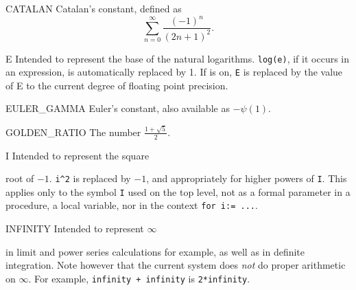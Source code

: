\begin{list}{}{\renewcommand{\makelabel}[1]{\texttt{#1}\hspace{\fill}}%
               \setlength{\labelsep}{1em}%
               }

\item[CATALAN] Catalan's constant, defined as
  \begin{displaymath}
    \sum_{n=0}^{\infty} \frac{(-1)^{n}}{(2n+1)^{2}} .
  \end{displaymath}

\item[E] Intended to represent the base of
the natural logarithms.  \texttt{log(e)}, if it occurs in an expression, is
automatically replaced by 1.  If  is
on, \texttt{E} is replaced by the value of E to the current degree of
floating point precision.

\item[EULER\_GAMMA] Euler's constant, also available as $-\psi(1)$.

\item[GOLDEN\_RATIO] The number $\frac{1+\sqrt{5}}{2}$.

\item[I] Intended to represent the square

root of $-1$. \texttt{i\textasciicircum2} is replaced by $-1$, and
appropriately for higher powers of \texttt{I}.  This applies only to the
symbol \texttt{I} used on the top
level, not as a formal parameter in a procedure, a local variable, nor in
the context \texttt{for i:= ...}.

\item[INFINITY] Intended to represent $\infty$

in limit and power series calculations for example, as well as in definite integration.
Note however that the
current system does \emph{not} do proper arithmetic on $\infty$.  For example,
\texttt{infinity + infinity} is \texttt{2*infinity}.


\end{list}
